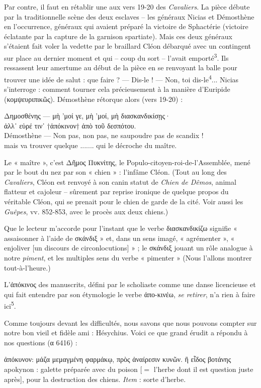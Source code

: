 \documentclass[12pt]{book}%
\newcommand{\italique}[1]{\textit{#1}}%
\newcommand{\citComm}[1]{\begin{quoting}[vskip=0pt] #1 \end{quoting}}%
\newcommand{\marqueur}[1]{\textsuperscript{#1}}%
\newenvironment{groupe}{%
\pstart%
\ledgroup%
}{%
\pend %
}%
\begin{document}
\begin{pages}
\begin{Leftside}
\begin{groupe}
{{Par contre, il faut en rétablir une aux vers 19-20 des \italique{Cavaliers}. La pièce débute par la traditionnelle scène des deux esclaves -- les généraux Nicias et Démosthène en l'occurrence, généraux qui avaient préparé la victoire de Sphactérie (victoire éclatante par la capture de la garnison spartiate). 
Mais ces deux généraux s'étaient fait voler la vedette par le braillard Cléon débarqué avec un contingent sur place au dernier moment et qui – coup du sort – l'avait emporté\marqueur{3}. Ils ressassent leur amertume au début de la pièce en se renvoyant la balle pour trouver une idée de salut : que faire ? — Dis-le ! — Non, toi dis-le\marqueur{4}... Nicias s'interroge : comment tourner cela précieusement à la manière d'Euripide (κομψευριπικῶς). Démosthène rétorque alors (vers 19-20) :
\citComm{Δημοσθένης --- μὴ 'μοί γε, μὴ 'μοί, μὴ διασκανδικίσῃς·\\
ἀλλ᾽ εὑρέ τιν᾽ †ἀπόκινον† ἀπὸ τοῦ δεσπότου.\\
Démosthène --- Non pas, non pas, ne saupoudre pas de scandix !\\
mais va trouver quelque .......  qui le décroche du maître.}%
Le « maître », c'est Δῆμος Πυκνίτης, le Populo-citoyen-roi-de-l'Assemblée, mené par le bout du nez par son « chien » : l'infâme Cléon. 
(Tout au long des \italique{Cavaliers}, Cléon est renvoyé à son canin statut de \italique{Chien de Dêmos}, animal flatteur et cajoleur – sûrement par reprise ironique de quelque propos du véritable Cléon, qui se prenait pour le chien de garde de la cité. Voir aussi les \italique{Guêpes}, vv. 852-853, avec le procès aux deux chiens.)


Que le lecteur m'accorde pour l'instant que le verbe διασκανδικίζω signifie « assaisonner à l'aide de σκάνδιξ » et, dans un sens imagé, « agrémenter », « enjoliver [un discours de circonlocutions] » ; le σκάνδιξ jouant un rôle analogue à notre \italique{piment}, et les multiples sens du verbe « pimenter » (Nous l'allons montrer tout-à-l'heure.)

L'ἀπόκινος des manuscrits, défini par le scholiaste comme une danse licencieuse et qui fait entendre par son étymologie le verbe ἀπο-κινέω, \italique{se retirer}, n'a rien à faire ici\marqueur{5}.

Comme toujours devant les difficultés, nous savons que nous pouvons compter sur notre bon vieil et fidèle ami : Hésychius. Voici ce que grand érudit a répondu à nos questions (α 6416) :%
\citComm{ἀπόκυνον: μάζα μεμαγμένη φαρμάκῳ, πρὸς ἀναίρεσιν κυνῶν. ἢ εἶδος βοτάνης\\
apokynon : galette préparée avec du poison [$=$ l'herbe dont il est question juste après], pour la destruction des chiens. \italique{Item} : sorte d'herbe.}


}}
\end{groupe}
\end{Leftside}
\end{pages}
\end{document}
